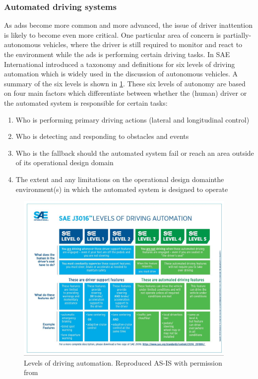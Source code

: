 \documentclass[11pt, parskip=half*,twoside=false]{scrbook}
\begin{document}
\subsubsection{Automated driving systems}
As \glspl{ads} become more common and more advanced, the issue of driver inattention is likely to become even more critical. One particular area of concern is partially-autonomous vehicles, where the driver is still required to monitor and react to the environment while the \gls{ads} is performing certain driving tasks.  In \citep{J3016_201806} SAE International introduced a taxonomy and definitions for six levels of driving automation which is widely used in the discussion of autonomous vehicles. A summary of the six levels is shown in \cref{fig:av_levels}. These six levels of autonomy are based on four main factors which differentiate between whether the (human) driver or the automated system is responsible for certain tasks: 

\begin{enumerate}
	\item Who is performing primary driving actions (lateral and longitudinal control) 
	\item Who is detecting and responding to obstacles and events
	\item Who is the fallback should the automated system fail or reach an area outside of its operational design domain
	\item The extent and any limitations on the operational design domain\textemdash the environment(s) in which the automated system is designed to operate
\end{enumerate}

\begin{figure} 
	\centering
	\includegraphics[width= 0.95\textwidth]{sae_av_levels} 
	\caption{Levels of driving automation. Reproduced AS-IS with permission from \citet{J3016_201806}}
	\label{fig:av_levels}
\end{figure}
\end{document}

